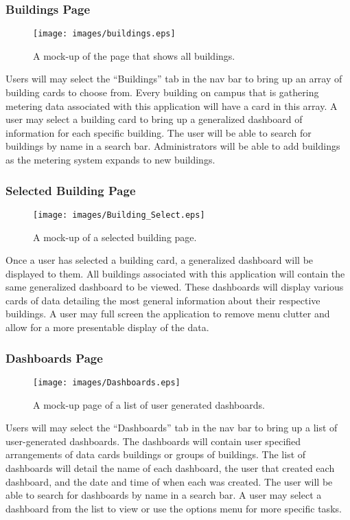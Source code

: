 \documentclass[journal,10pt,onecolumn,compsoc]{IEEEtran}
\begin{document}
	
    \subsubsection{Buildings Page} 
    \begin{figure}[H]
        \centering
        \texttt{[image: images/buildings.eps]}
        \caption{A mock-up of the page that shows all buildings.}
    \end{figure}
	Users will may select the ``Buildings'' tab in the nav bar to bring up an array of building cards to choose from.
	Every building on campus that is gathering metering data associated with this application will have a card in this array.
	A user may select a building card to bring up a generalized dashboard of information for each specific building. 
	The user will be able to search for buildings by name in a search bar. Administrators will be able to add buildings
	as the metering system expands to new buildings.
	
    \subsubsection{Selected Building Page}
    \begin{figure}[H]
        \centering
        \texttt{[image: images/Building\_Select.eps]}
        \caption{A mock-up of a selected building page.}
    \end{figure}
	Once a user has selected a building card, a generalized dashboard will be displayed to them.
	All buildings associated with this application will contain the same generalized dashboard to be viewed.
	These dashboards will display various cards of data detailing the most general information about their respective buildings.
	A user may full screen the application to remove menu clutter and allow for a more presentable display of the data.
	
	\subsubsection{Dashboards Page}
    \begin{figure}[H]
        \centering
        \texttt{[image: images/Dashboards.eps]}
        \caption{A mock-up page of a list of user generated dashboards.}
    \end{figure}
	Users will may select the ``Dashboards'' tab in the nav bar to bring up a list of user-generated dashboards.
	The dashboards will contain user specified arrangements of data cards buildings or groups of buildings. 
	The list of dashboards will detail the name of each dashboard, the user that created each dashboard, and the date and time of when each was created.
	The user will be able to search for dashboards by name in a search bar. 
	A user may select a dashboard from the list to view or use the options menu for more specific tasks.
	
\end{document}
